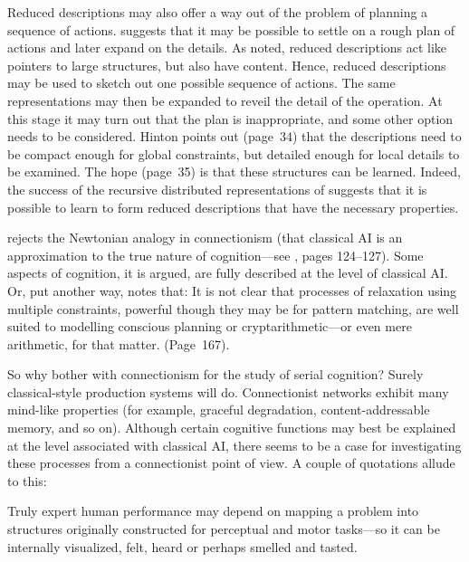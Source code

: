 Reduced descriptions may also offer a way out of the problem
of planning a sequence of actions.
 suggests that it may be possible to settle on a rough
plan of actions and later expand on the details.  As noted, reduced
descriptions act like pointers to large structures, but also have
content.  Hence, reduced descriptions may be used to sketch out one
possible sequence of actions.  The same representations may then be
expanded to reveil the detail of the operation.  At this stage it may
turn out that the plan is inappropriate, and some other option needs
to be considered. Hinton points out (page~34) that the descriptions
need to be compact enough for global constraints, but detailed enough
for local details to be examined.  The hope (page~35)  is that these
structures can be learned. Indeed, the success of the recursive
distributed representations of  suggests that it is
possible to learn to form reduced descriptions that have the necessary
properties.


\label{connect}

 rejects the Newtonian analogy in connectionism
(that classical AI is an approximation to the true nature of
cognition---see , pages 124--127).
Some aspects of cognition, it is argued, are fully described at the
level of classical AI.   Or, put another way,  notes
that:
\bssq
It is not clear that processes of relaxation using multiple
constraints, powerful though they may be for pattern matching, are
well suited to modelling conscious planning or cryptarithmetic---or
even mere arithmetic, for that matter. (Page~167).
\essq

So why bother with connectionism for the study of serial cognition?
Surely classical-style production systems will do.
Connectionist networks exhibit many mind-like properties (for
example, graceful degradation, content-addressable memory, and so
on). Although certain cognitive functions may best be explained
at the level associated with classical AI, there seems to be a
case for investigating these processes from a connectionist
point of view.  A couple of quotations allude to this:

\bssq
Truly expert human performance may depend on mapping a problem
into structures originally constructed for perceptual and motor
tasks---so it can be internally visualized, felt, heard or
perhaps smelled and tasted.

\hfill \cite[page 177]{morahuma}
\essq

